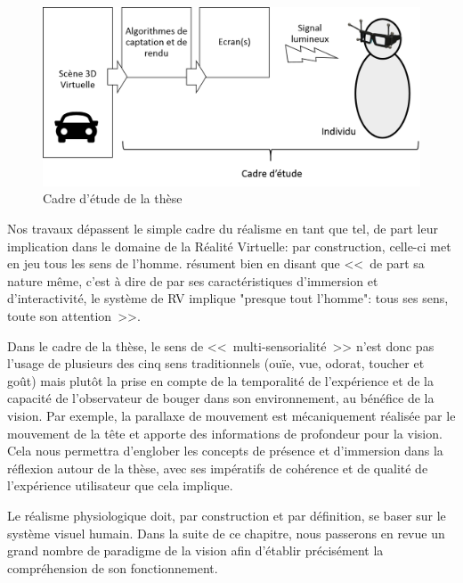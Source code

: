 	\begin{figure}
		\centering
		\includegraphics[scale=.65]{Figures/CadreEtude}
		\caption{Cadre d'étude de la thèse}
		\label{fig:champ_d_etude_these}
	\end{figure}
	
	\par Nos travaux dépassent le simple cadre du réalisme en tant que tel, de part leur implication dans le domaine de la Réalité Virtuelle: par construction, celle-ci met en jeu tous les sens de l'homme. \citep{burdea_realite_1993} résument bien en disant que <<~de part sa nature même, c'est à dire de par ses caractéristiques d'immersion et d'interactivité, le système de RV implique "presque tout l'homme": tous ses sens, toute son attention~>>.
	
	\par Dans le cadre de la thèse, le sens de <<~multi-sensorialité~>> n'est donc pas l'usage de plusieurs des cinq sens traditionnels (ouïe, vue, odorat, toucher et goût) mais plutôt la prise en compte de la temporalité de l'expérience et de la capacité de l'observateur de bouger dans son environnement, au bénéfice de la vision. Par exemple, la parallaxe de mouvement est mécaniquement réalisée par le mouvement de la tête et apporte des informations de profondeur pour la vision. Cela nous permettra d'englober les concepts de présence et d'immersion dans la réflexion autour de la thèse, avec ses impératifs de cohérence et de qualité de l'expérience utilisateur que cela implique.
	
	\par Le réalisme physiologique doit, par construction et par définition, se baser sur le système visuel humain. Dans la suite de ce chapitre, nous passerons en revue un grand nombre de paradigme de la vision afin d'établir précisément la compréhension de son fonctionnement.

